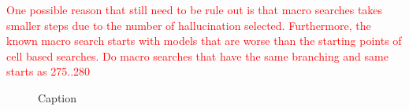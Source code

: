\documentclass{article}
\newcommand{\todo}[1]{\textcolor{red}{#1}}
\begin{document}
\todo{One possible reason that still need to be rule out is that macro searches takes smaller steps due to the number of hallucination selected. Furthermore, the known macro search starts with models that are worse than the starting points of cell based searches. Do macro searches that have the same branching and same starts as 275..280}


\begin{figure}[t]
    \centering
    
    \caption{Caption}
    \label{fig:cell_vs_macro}
\end{figure}



\end{document}
